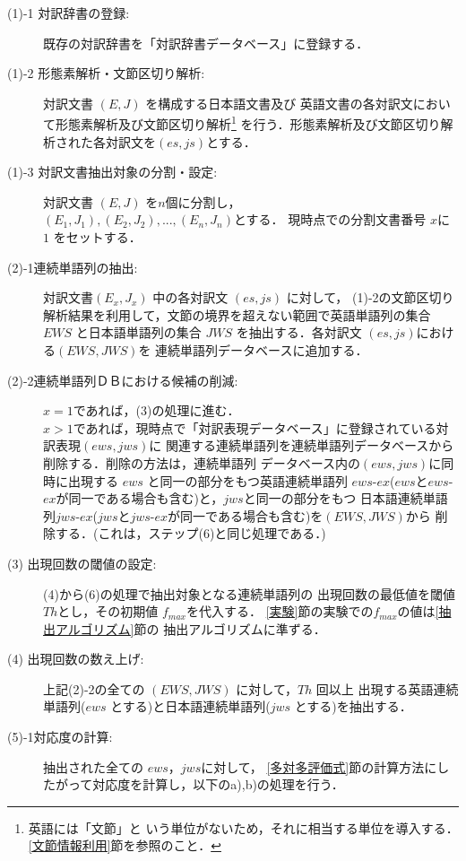 \begin{description}
\item[(1)-1 対訳辞書の登録:] 既存の対訳辞書を「対訳辞書データベース」に登録する．

\item[(1)-2 形態素解析・文節区切り解析:] 対訳文書 $(E,J)$ を構成する日本語文書及び
英語文書の各対訳文において形態素解析及び文節区切り解析\footnote{英語には「文節」と
いう単位がないため，それに相当する単位を導入する．\ref{文節情報利用}節を参照のこと．}
を行う．形態素解析及び文節区切り解析された各対訳文を$(es,js)$とする． 

\item[(1)-3 対訳文書抽出対象の分割・設定:] 対訳文書 $(E,J)$ を$n$個に分割し，\\
$(E_{1},J_{1}),(E_{2},J_{2}),...,(E_{n},J_{n})$とする．
現時点での分割文書番号 $x$に $1$ をセットする．

\item[(2)-1連続単語列の抽出:] 対訳文書$(E_{x},J_{x})$ 中の各対訳文 $(es,js)$ に対して，
(1)-2の文節区切り解析結果を利用して，文節の境界を超えない範囲で英語単語列の集合 
$EWS$ と日本語単語列の集合 $JWS$ を抽出する．各対訳文 $(es,js)$における$(EWS,JWS)$を
連続単語列データベースに追加する．

\item[(2)-2連続単語列ＤＢにおける候補の削減:] $x=1$であれば，(3)の処理に進む．\\
$x > 1 $であれば，現時点で「対訳表現データベース」に登録されている対訳表現$(ews,jws)$に
関連する連続単語列を連続単語列データベースから削除する．削除の方法は，連続単語列
データベース内の$(ews,jws)$に同時に出現する $ews$ と同一の部分をもつ英語連続単語列 
$ews$-$ex$($ews$と$ews$-$ex$が同一である場合も含む)と，$jws$と同一の部分をもつ
日本語連続単語列$jws$-$ex$($jws$と$jws$-$ex$が同一である場合も含む)を$(EWS,JWS)$から
削除する．(これは，ステップ(6)と同じ処理である．)

\item[(3) 出現回数の閾値の設定:] (4)から(6)の処理で抽出対象となる連続単語列の
出現回数の最低値を閾値$Th$とし，その初期値 $f_{max}$を代入する．
\ref{実験}節の実験での$f_{max}$の値は\ref{抽出アルゴリズム}節の
抽出アルゴリズムに準ずる． 

\item[(4) 出現回数の数え上げ:] 上記(2)-2の全ての $(EWS,JWS)$ に対して，$Th$ 回以上
出現する英語連続単語列($ews$ とする)と日本語連続単語列($jws$ とする)を抽出する． 

\item[(5)-1対応度の計算: ] 抽出された全ての $ews$，$jws$に対して，
\ref{多対多評価式}節の計算方法にしたがって対応度を計算し，以下のa),b)の処理を行う．


\end{description}
